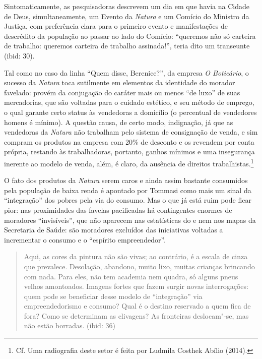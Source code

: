 Sintomaticamente, as pesquisadoras descrevem um dia em que havia na
Cidade de Deus, simultaneamente, um Evento da \emph{Natura} e um Comício
do Ministro da Justiça, com preferência clara para o primeiro evento e
manifestações de descrédito da população ao passar ao lado do Comício:
``queremos não só carteira de trabalho: queremos carteira de trabalho
assinada!'', teria dito um transeunte (ibid: 30).

Tal como no caso da linha ``Quem disse, Berenice?'', da empresa \emph{O
Boticário}, o sucesso da \emph{Natura} toca sutilmente em elementos da
identidade do morador favelado: provém da conjugação do caráter mais ou
menos ``de luxo'' de suas mercadorias, que são voltadas para o cuidado
estético, e seu método de emprego, o qual garante certo status às
vendedoras a domicílio (o percentual de vendedores homens é mínimo). A
questão causa, de certo modo, indignação, já que as vendedoras da
\emph{Natura} não trabalham pelo sistema de consignação de venda, e sim
compram os produtos na empresa com 20\% de desconto e os revendem por
conta própria, restando às trabalhadoras, portanto, ganhos mínimos e uma
insegurança inerente ao modelo de venda, além, é claro, da ausência de
direitos trabalhistas.\footnote{Cf. Uma radiografia deste setor é feita
  por Ludmila Costhek Abílio (2014).}

O fato dos produtos da \emph{Natura} serem caros e ainda assim bastante
consumidos pela população de baixa renda é apontado por Tommasi como
mais um sinal da ``integração'' dos pobres pela via do consumo. Mas o
que já está ruim pode ficar pior: nas proximidades das favelas
pacificadas há contingentes enormes de moradores ``invisíveis'', que não
aparecem nas estatísticas do  e nem nos mapas da Secretaria de
Saúde: são moradores excluídos das iniciativas voltadas a incrementar o
consumo e o ``espírito empreendedor''.

\begin{quote}
Aqui, as cores da pintura não são vivas; ao contrário, é a escala de
cinza que prevalece. Desolação, abandono, muito lixo, muitas crianças
brincando com nada. Para eles, não tem academia nem quadra, só alguns
pneus velhos amontoados. Imagens fortes que fazem surgir novas
interrogações: quem pode se beneficiar desse modelo de ``integração''
via empreendedorismo e consumo? Qual é o destino reservado a quem fica
de fora? Como se determinam as clivagens? As fronteiras deslocam"-se, mas
não estão borradas. (ibid: 36)
\end{quote}

